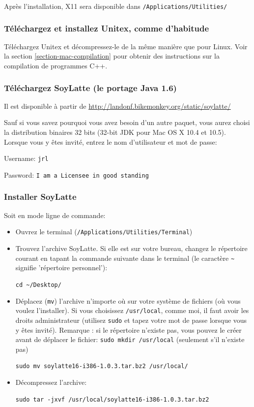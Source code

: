 \bigskip
\noindent Après l'installation, X11 sera disponible dans
\verb+/Applications/Utilities/+


\subsubsection{Téléchargez et installez Unitex, comme d'habitude}
\noindent Téléchargez Unitex et décompressez-le de la même manière que pour Linux.
Voir la section \ref{section-mac-compilation} pour obtenir des instructions sur la compilation de
programmes C++.

\subsubsection{Téléchargez SoyLatte (le portage Java 1.6)}
\noindent Il est disponible à partir de
\url{http://landonf.bikemonkey.org/static/soylatte/} 

\bigskip
\noindent Sauf si vous savez pourquoi vous avez besoin d'un autre paquet, vous aurez choisi
la distribution binaires 32 bits (32-bit JDK pour Mac OS X 10.4 et 10.5).
Lorsque vous y êtes invité, entrez le nom d'utilisateur et mot de passe:

\bigskip
Username: \verb+jrl+

Password: \verb+I am a Licensee in good standing+


\subsubsection{Installer SoyLatte}
\noindent Soit en mode ligne de commande:
\begin{itemize}
    \item Ouvrez le terminal (\verb+/Applications/Utilities/Terminal+)
    \item Trouvez l'archive SoyLatte. Si elle est sur votre bureau, changez le
     répertoire courant en tapant la commande suivante dans le terminal 
     (le caractère \verb+~+ signifie 'répertoire personnel'): 
    
    \bigskip
    \verb+cd ~/Desktop/+
    
\item Déplacez (\verb+mv+) l'archive n'importe où sur votre système de fichiers (où vous
voulez l'installer). Si vous choisissez \verb+/usr/local+, comme moi, il faut avoir
les droits administrateur (utilisez \verb+sudo+ et tapez votre mot de passe lorsque vous y êtes
	invité). Remarque : si le répertoire n'existe pas, vous pouvez le créer avant de déplacer le
fichier:
    \bigskip
    \verb+sudo mkdir /usr/local+ (seulement s'il n'existe pas)
    
    \verb+sudo mv soylatte16-i386-1.0.3.tar.bz2 /usr/local/+

    \item Décompressez l'archive:
    
    \bigskip
    \verb+sudo tar -jxvf /usr/local/soylatte16-i386-1.0.3.tar.bz2+ 
\end{itemize}

